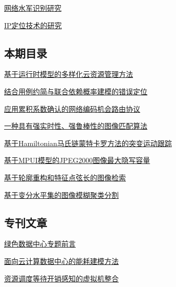 \documentclass[a4paper]{article}
\begin{document}
\href{http://www.jos.org.cn/ch/reader/download_pdf.aspx?file_no=4617&year_id=2014&quarter_id=7&falg=1}{网络水军识别研究}

\href{http://www.jos.org.cn/ch/reader/download_pdf.aspx?file_no=4621&year_id=2014&quarter_id=7&falg=1}{IP定位技术的研究}

\subsection{本期目录}
\href{http://www.jos.org.cn/ch/reader/download_pdf.aspx?file_no=4457&year_id=2014&quarter_id=7&falg=1}{基于运行时模型的多样化云资源管理方法}

\href{http://www.jos.org.cn/ch/reader/download_pdf.aspx?file_no=4518&year_id=2014&quarter_id=7&falg=1}{结合用例约简与联合依赖概率建模的错误定位}

\href{http://www.jos.org.cn/ch/reader/download_pdf.aspx?file_no=4451&year_id=2014&quarter_id=7&falg=1}{应用累积系数确认的网络编码机会路由协议}

\href{http://www.jos.org.cn/ch/reader/download_pdf.aspx?file_no=4450&year_id=2014&quarter_id=7&falg=1}{一种具有强实时性、强鲁棒性的图像匹配算法}

\href{http://www.jos.org.cn/ch/reader/download_pdf.aspx?file_no=4453&year_id=2014&quarter_id=7&falg=1}{基于Hamiltonian马氏链蒙特卡罗方法的突变运动跟踪}

\href{http://www.jos.org.cn/ch/reader/download_pdf.aspx?file_no=4489&year_id=2014&quarter_id=7&falg=1}{基于MPUI模型的JPEG2000图像最大隐写容量}

\href{http://www.jos.org.cn/ch/reader/download_pdf.aspx?file_no=4443&year_id=2014&quarter_id=7&falg=1}{基于轮廓重构和特征点弦长的图像检索}

\href{http://www.jos.org.cn/ch/reader/download_pdf.aspx?file_no=4449&year_id=2014&quarter_id=7&falg=1}{基于变分水平集的图像模糊聚类分割}

\subsection{专刊文章}
\href{http://www.jos.org.cn/ch/reader/download_pdf.aspx?file_no=4605&year_id=2014&quarter_id=7&falg=1}{绿色数据中心专题前言}

\href{http://www.jos.org.cn/ch/reader/download_pdf.aspx?file_no=4604&year_id=2014&quarter_id=7&falg=1}{面向云计算数据中心的能耗建模方法}

\href{http://www.jos.org.cn/ch/reader/download_pdf.aspx?file_no=4602&year_id=2014&quarter_id=7&falg=1}{资源调度等待开销感知的虚拟机整合}
\end{document}
